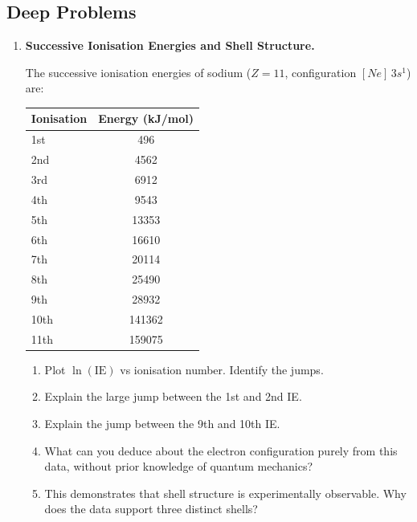 \documentclass[12pt, a4paper]{book}
\begin{document}
\subsection*{Deep Problems}

\begin{deepbox}
\begin{enumerate}[label=\textbf{D\arabic*.}]

  \item \textbf{Successive Ionisation Energies and Shell Structure.}

        The successive ionisation energies of sodium
        ($Z=11$, configuration $[Ne]\,3s^1$) are:
        \begin{center}
        \begin{tabular}{lc}
        \toprule
        Ionisation & Energy (kJ/mol) \\
        \midrule
        1st  & 496 \\
        2nd  & 4562 \\
        3rd  & 6912 \\
        4th  & 9543 \\
        5th  & 13353 \\
        6th  & 16610 \\
        7th  & 20114 \\
        8th  & 25490 \\
        9th  & 28932 \\
        10th & 141362 \\
        11th & 159075 \\
        \bottomrule
        \end{tabular}
        \end{center}
        \begin{enumerate}[label=(\alph*)]
          \item Plot $\ln(\text{IE})$ vs ionisation number.
                Identify the jumps.
          \item Explain the large jump between the 1st and 2nd IE.
          \item Explain the jump between the 9th and 10th IE.
          \item What can you deduce about the electron
                configuration purely from this data,
                without prior knowledge of quantum mechanics?
          \item This demonstrates that shell structure is
                experimentally observable.
                Why does the data support three distinct shells?
        \end{enumerate}


\end{enumerate}
\end{deepbox}
\end{document}
